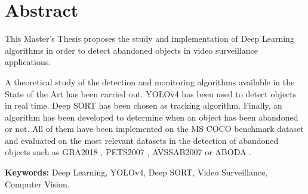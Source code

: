 
\chapter*{Abstract}
\label{cha:abstract}

\noindent
This Master's Thesis proposes the study and implementation of Deep Learning algorithms in order to detect abandoned objects in video surveillance applications.

A theoretical study of the detection and monitoring algorithms available in the State of the Art has been carried out. YOLOv4 \cite{bochkovskiy2020yolov4} has been used to detect objects in real time. Deep SORT \cite{Wojke2017simple} has been chosen as tracking algorithm. Finally, an algorithm has been developed to determine when an object has been abandoned or not. All of them have been implemented on the MS COCO \cite{lin2015microsoft} benchmark dataset and evaluated on the most relevant datasets in the detection of abandoned objects such as GBA2018 \cite{gba-dataset}, PETS2007 \cite{pets2007-dataset}, AVSSAB2007 \cite{AVSSAB2007-dataset} or ABODA \cite{aboda-dataset}.

\textbf{Keywords:} Deep Learning, YOLOv4, Deep SORT, Video Surveillance, Computer Vision.